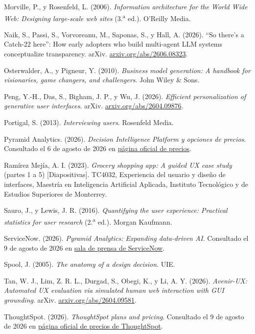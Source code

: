 \begin{uxreferencias}
Morville, P., y Rosenfeld, L. (2006). \textit{Information architecture for the World Wide Web:
Designing large-scale web sites} (3.\textsuperscript{a} ed.). O'Reilly Media.

Naik, S., Passi, S., Vorvoreanu, M., Saponas, S., y Hall, A. (2026). ``So there's a Catch-22
here'': How early adopters who build multi-agent LLM systems conceptualize transparency. arXiv.
\href{https://arxiv.org/abs/2606.08323}{arxiv.org/abs/2606.08323}.

Osterwalder, A., y Pigneur, Y. (2010). \textit{Business model generation: A handbook for
visionaries, game changers, and challengers}. John Wiley \& Sons.

Peng, Y.-H., Das, S., Bigham, J. P., y Wu, J. (2026). \textit{Efficient personalization of
generative user interfaces}. arXiv.
\href{https://arxiv.org/abs/2604.09876}{arxiv.org/abs/2604.09876}.

Portigal, S. (2013). \textit{Interviewing users}. Rosenfeld Media.

Pyramid Analytics. (2026). \textit{Decision Intelligence Platform y opciones de precios}.
Consultado el 6 de agosto de 2026 en
\href{https://www.pyramidanalytics.com/decision-intelligence-platform/get-pricing/}{página oficial
de precios}.

Ramírez Mejía, A. I. (2023). \textit{Grocery shopping app: A guided UX case study} (partes 1 a 5)
[Diapositivas]. TC4032, Experiencia del usuario y diseño de interfaces, Maestría en Inteligencia
Artificial Aplicada, Instituto Tecnológico y de Estudios Superiores de Monterrey.

Sauro, J., y Lewis, J. R. (2016). \textit{Quantifying the user experience: Practical statistics
for user research} (2.\textsuperscript{a} ed.). Morgan Kaufmann.

ServiceNow. (2026). \textit{Pyramid Analytics: Expanding data-driven AI}. Consultado el 9 de
agosto de 2026 en
\href{https://www.servicenow.com/workflow/news/pyramid-analytics-expanding-data-driven-ai.html}{sala
de prensa de ServiceNow}.

Spool, J. (2005). \textit{The anatomy of a design decision}. UIE.

Tan, W. J., Lim, Z. R. L., Durgad, S., Obegi, K., y Li, A. Y. (2026). \textit{Avenir-UX: Automated
UX evaluation via simulated human web interaction with GUI grounding}. arXiv.
\href{https://arxiv.org/abs/2604.09581}{arxiv.org/abs/2604.09581}.

ThoughtSpot. (2026). \textit{ThoughtSpot plans and pricing}. Consultado el 9 de agosto de 2026 en
\href{https://www.thoughtspot.com/pricing}{página oficial de precios de ThoughtSpot}.


\end{uxreferencias}
